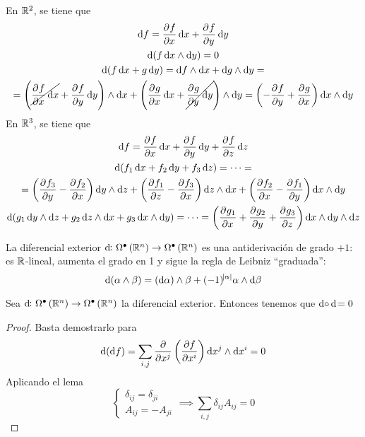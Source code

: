 \begin{example*}
    En $\mathbb{R}^2$, se tiene que
    \begin{gather*}
        \dif f = \pdv{f}{x} \dif x + \pdv{f}{y} \dif y \\
        \dif \left( f \dif x \wedge \dif y \right) = 0 \\
        \dif\left( f \dif x + g \dif y \right) = \dif f \wedge \dif x + \dif g \wedge \dif y =\\=
        \left( \cancel{\pdv{f}{x} \dif x} + \pdv{f}{y} \dif y \right) \wedge \dif x + \left( \pdv{g}{x} \dif x + \cancel{\pdv{g}{y} \dif y} \right)\wedge \dif y =
        \left( -\pdv{f}{y} + \pdv{g}{x} \right) \dif x \wedge \dif y
    \end{gather*}
    En $\mathbb{R}^3$, se tiene que
    \begin{gather*}
        \dif f = \pdv{f}{x} \dif x + \pdv{f}{y} \dif y + \pdv{f}{z} \dif z \\
        \dif \left( f_1 \dif x + f_2 \dif y + f_3 \dif z \right) = \cdots = \\ = \left( \pdv{f_3}{y} - \pdv{f_2}{x} \right)\dif y \wedge \dif z +
        \left( \pdv{f_1}{z} - \pdv{f_3}{x} \right) \dif z \wedge \dif x + \left( \pdv{f_2}{x} - \pdv{f_1}{y} \right)\dif x \wedge \dif y \\
        \dif \left( g_1 \dif y \wedge \dif z +  g_2 \dif z \wedge \dif x + g_3 \dif x \wedge \dif y \right) = \cdots =
        \left( \pdv{g_1}{x} + \pdv{g_2}{y} + \pdv{g_3}{z} \right) \dif x \wedge \dif y \wedge \dif z
    \end{gather*}
\end{example*}

\begin{obs}
    La diferencial exterior $\dif \colon \Omega^\bullet \left( \real^n \right) \to \Omega^\bullet \left( \real^n \right)$ es una antiderivación de
    grado $+1$: es $\mathbb{R}$-lineal, aumenta el grado en 1 y sigue la regla de Leibniz ``graduada'':
    \[
        \dif \left( \alpha \wedge \beta \right) = \left( \dif \alpha \right) \wedge \beta + (-1)^{\abs{\alpha}} \alpha \wedge \dif \beta
    \]
\end{obs}

\begin{prop}\label{prop:d-cuadrado}
    Sea $\dif \colon \Omega^\bullet \left( \real^n \right) \to \Omega^\bullet \left( \real^n \right)$ la diferencial exterior. Entonces tenemos que $\dif \circ \dif = 0$
\end{prop}
\begin{proof}
    Basta demostrarlo para
    \[
        \dif \left( \dif f \right) = \sum_{i,j} \frac{\partial}{\partial x^j} \left( \frac{\partial f}{\partial x^i} \right) \dif x^j \wedge \dif x^i = 0
    \]
    Aplicando el lema
    \[
        \begin{cases}
            \delta_{ij} = \delta_{ji} \\ A_{ij} = - A_{ji}
        \end{cases} \implies
        \sum_{i,j} \delta_{ij} A_{ij} = 0
    \]
\end{proof}

